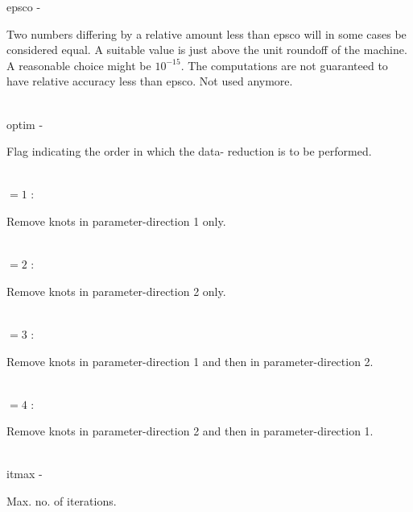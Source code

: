         \>\>    {\fov epsco}\> - \>      \begin{minipg2}
                                Two numbers differing by a relative amount less
                                than epsco will in some cases be considered equal.
                                A suitable value is just above the unit roundoff of
                                the machine.
                                A reasonable choice might be $10^{-15}$. The
                                computations are not guaranteed to have relative
                                accuracy less than epsco.
                                Not used anymore.
                                \end{minipg2}\\[0.3ex]
        \>\>    {\fov optim}\> - \>             \begin{minipg2}
                                Flag indicating the order in which the data-
                                reduction is to be performed.
                                \end{minipg2}\\[0.3ex]
                \>\>\>\>\>      $= 1$ :\>\begin{minipg5}
                                Remove knots in parameter-direction 1 only.
                                \end{minipg5}\\[0.3ex]
                \>\>\>\>\>      $= 2$ : \>\begin{minipg5}
                                Remove knots in parameter-direction 2 only.
                                \end{minipg5}\\[0.3ex]
                \>\>\>\>\>      $= 3$ : \>\begin{minipg5}
                                        Remove knots in parameter-direction 1
                                                and then in parameter-direction 2.
                                \end{minipg5}\\[0.3ex]
                \>\>\>\>\>      $= 4$ : \>\begin{minipg5}
                                        Remove knots in parameter-direction 2
                                                and then in parameter-direction 1.
                                \end{minipg5}\\[0.3ex]
        \>\>    {\fov itmax}\> - \>     \begin{minipg2}
                                Max. no. of iterations.
                                \end{minipg2}\\
